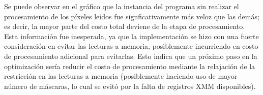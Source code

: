 Se puede observar en el gráfico que la instancia del programa sin realizar el procesamiento de los píxeles leídos fue signficativamente más veloz que las demás; es decir, la mayor parte del costo total deviene de la etapa de procesamiento. Esta información fue inesperada, ya que la implementación se hizo con una fuerte consideración en evitar las lecturas a memoria, posiblemente incurriendo en costo de procesamiento adicional para evitarlas. Esto indica que un próximo paso en la optimización sería reducir el costo de procesamiento mediante la relajación de la restricción en las lecturas a memoria (posiblemente haciendo uso de mayor número de máscaras, lo cual se evitó por la falta de registros XMM disponibles).